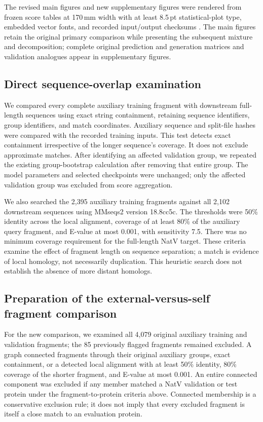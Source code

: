 \documentclass[referee,pdflatex,sn-vancouver-num]{sn-jnl}
\begin{document}
The revised main figures and new supplementary figures were rendered from frozen score tables at 170\,mm width with at least 8.5\,pt statistical-plot type, embedded vector fonts, and recorded input/output checksums \cite{natvfigures}. The main figures retain the original primary comparison while presenting the subsequent mixture and decomposition; complete original prediction and generation matrices and validation analogues appear in supplementary figures.

\subsection{Direct sequence-overlap examination}
We compared every complete auxiliary training fragment with downstream full-length sequences using exact string containment, retaining sequence identifiers, group identifiers, and match coordinates. Auxiliary sequence and split-file hashes were compared with the recorded training inputs. This test detects exact containment irrespective of the longer sequence's coverage. It does not exclude approximate matches. After identifying an affected validation group, we repeated the existing group-bootstrap calculation after removing that entire group. The model parameters and selected checkpoints were unchanged; only the affected validation group was excluded from score aggregation.

We also searched the 2,395 auxiliary training fragments against all 2,102 downstream sequences using MMseqs2 version 18.8cc5c. The thresholds were 50\% identity across the local alignment, coverage of at least 80\% of the auxiliary query fragment, and E-value at most 0.001, with sensitivity 7.5. There was no minimum coverage requirement for the full-length NatV target. These criteria examine the effect of fragment length on sequence separation; a match is evidence of local homology, not necessarily duplication. This heuristic search does not establish the absence of more distant homologs.

\subsection{Preparation of the external-versus-self fragment comparison}
For the new comparison, we examined all 4,079 original auxiliary training and validation fragments; the 85 previously flagged fragments remained excluded. A graph connected fragments through their original auxiliary groups, exact containment, or a detected local alignment with at least 50\% identity, 80\% coverage of the shorter fragment, and E-value at most 0.001. An entire connected component was excluded if any member matched a NatV validation or test protein under the fragment-to-protein criteria above. Connected membership is a conservative exclusion rule; it does not imply that every excluded fragment is itself a close match to an evaluation protein.
\end{document}
